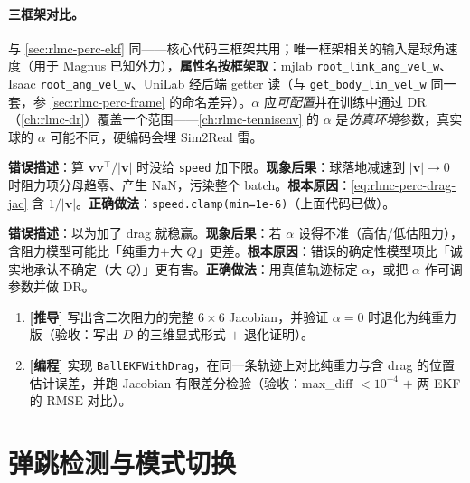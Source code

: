\paragraph{三框架对比。}与 \cref{sec:rlmc-perc-ekf} 同——核心代码三框架共用；唯一框架相关的输入是球角速度（用于 Magnus 已知外力），\textbf{属性名按框架取}：mjlab \verb|root_link_ang_vel_w|、Isaac \verb|root_ang_vel_w|、UniLab 经后端 getter 读（与 \verb|get_body_lin_vel_w| 同一套，参 \cref{sec:rlmc-perc-frame} 的命名差异）。$\alpha$ 应\emph{可配置}并在训练中通过 DR（\cref{ch:rlmc-dr}）覆盖一个范围——\cref{ch:rlmc-tennisenv} 的 $\alpha$ 是\emph{仿真环境}参数，真实球的 $\alpha$ 可能不同，硬编码会埋 Sim2Real 雷。

\begin{pitfall}
\textbf{错误描述}：算 $\mathbf v\mathbf v^{\!\top}/|\mathbf v|$ 时没给 \verb|speed| 加下限。\textbf{现象后果}：球落地减速到 $|\mathbf v|\to 0$ 时阻力项分母趋零、产生 NaN，污染整个 batch。\textbf{根本原因}：\eqref{eq:rlmc-perc-drag-jac} 含 $1/|\mathbf v|$。\textbf{正确做法}：\verb|speed.clamp(min=1e-6)|（上面代码已做）。
\end{pitfall}

\begin{pitfall}
\textbf{错误描述}：以为加了 drag 就稳赢。\textbf{现象后果}：若 $\alpha$ 设得不准（高估/低估阻力），含阻力模型可能比「纯重力$+$大 $Q$」更差。\textbf{根本原因}：错误的确定性模型项比「诚实地承认不确定（大 $Q$）」更有害。\textbf{正确做法}：用真值轨迹标定 $\alpha$，或把 $\alpha$ 作可调参数并做 DR。
\end{pitfall}

\begin{practice}[本节动手任务]
\begin{enumerate}
  \item \textbf{[推导]} 写出含二次阻力的完整 $6\times 6$ Jacobian，并验证 $\alpha=0$ 时退化为纯重力版（验收：写出 $D$ 的三维显式形式 $+$ 退化证明）。
  \item \textbf{[编程]} 实现 \verb|BallEKFWithDrag|，在同一条轨迹上对比纯重力与含 drag 的位置估计误差，并跑 Jacobian 有限差分检验（验收：max\_diff $<10^{-4}$ $+$ 两 EKF 的 RMSE 对比）。
\end{enumerate}
\end{practice}

\section{弹跳检测与模式切换}
\label{sec:rlmc-perc-bounce}

